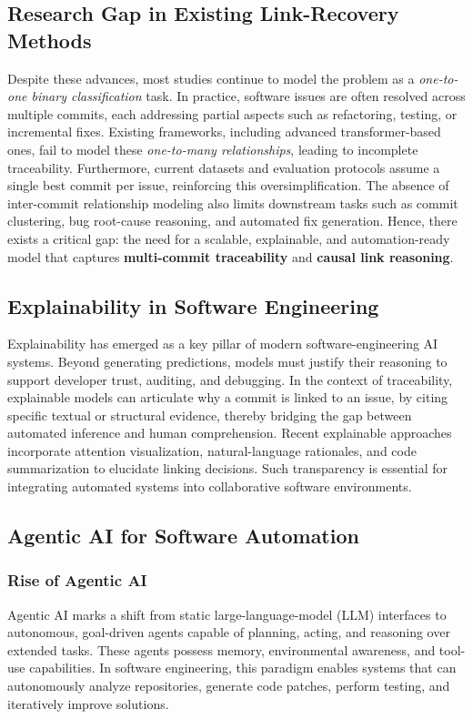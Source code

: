 \subsection{Research Gap in Existing Link-Recovery Methods}
Despite these advances, most studies continue to model the problem as a \emph{one-to-one binary classification} task. In practice, software issues are often resolved across multiple commits, each addressing partial aspects such as refactoring, testing, or incremental fixes. Existing frameworks, including advanced transformer-based ones, fail to model these \emph{one-to-many relationships}, leading to incomplete traceability.  
Furthermore, current datasets and evaluation protocols assume a single best commit per issue, reinforcing this oversimplification. The absence of inter-commit relationship modeling also limits downstream tasks such as commit clustering, bug root-cause reasoning, and automated fix generation.  
Hence, there exists a critical gap: the need for a scalable, explainable, and automation-ready model that captures \textbf{multi-commit traceability} and \textbf{causal link reasoning}.

\subsection{Explainability in Software Engineering}
Explainability has emerged as a key pillar of modern software-engineering AI systems. Beyond generating predictions, models must justify their reasoning to support developer trust, auditing, and debugging.  
In the context of traceability, explainable models can articulate why a commit is linked to an issue, by citing specific textual or structural evidence, thereby bridging the gap between automated inference and human comprehension.  
Recent explainable approaches incorporate attention visualization, natural-language rationales, and code summarization to elucidate linking decisions. Such transparency is essential for integrating automated systems into collaborative software environments.

\subsection{Agentic AI for Software Automation}
\subsubsection*{Rise of Agentic AI}
Agentic AI marks a shift from static large-language-model (LLM) interfaces to autonomous, goal-driven agents capable of planning, acting, and reasoning over extended tasks. These agents possess memory, environmental awareness, and tool-use capabilities. In software engineering, this paradigm enables systems that can autonomously analyze repositories, generate code patches, perform testing, and iteratively improve solutions.\\


